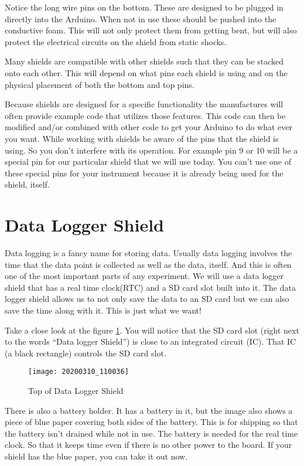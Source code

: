 	Notice the long wire pins on the bottom. These are designed to be plugged in directly into the Arduino. When not in use these should be pushed into the conductive foam. This will not only protect them from getting bent, but will also protect the electrical circuits on the shield from static shocks.
	
	Many shields are compatible with other shields such that they can be stacked onto each other. This will depend on what pins each shield is using and on the physical placement of both the bottom and top pins.
	
	Because shields are designed for a specific functionality the manufactures will often provide example code that utilizes those features. This code can then be modified and/or combined with other code to get your Arduino to do what ever you want. While working with shields be aware of the pins that the shield is using. So you don't interfere with its operation. For example pin 9 or 10 will be a special pin for our particular shield that we will use today.  You can't use one of these special pins for your instrument because it is already being used for the shield, itself.

\section{Data Logger Shield}
	Data logging is a fancy name for storing data.  Usually data logging involves the time that the data point is collected as well as the data, itself. And this is often one of the most important parts of any experiment. We will use a data logger shield that has a real time clock(RTC) and a SD card slot built into it. The data logger shield allows us to not only save the data to an SD card but we can also save the time along with it. This is just what we want!
	
	Take a close look at the figure \ref{Data_Logger}. You will notice that the SD card slot (right next to the words ``Data logger Shield'') is close to an integrated circuit (IC). That IC (a black rectangle) controls the SD card slot. 
	
	\begin{figure}[h!] 
		\centering
		\caption{Top of Data Logger Shield}
		\label{Data_Logger}
		\texttt{[image: 20200310\_110036]}
	\end{figure}
	
	There is also a battery holder. It has a battery in it, but the image also shows a piece of blue paper covering both sides of the battery. This is for shipping so that the battery isn't drained while not in use. The battery is needed for the real time clock. So that it keeps time even if there is no other power to the board. If your shield has the blue paper, you can take it out now.
	
